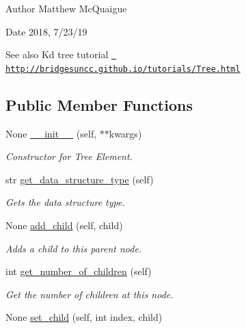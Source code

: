 \begin{DoxyAuthor}{Author}
Matthew Mc\+Quaigue
\end{DoxyAuthor}
\begin{DoxyDate}{Date}
2018, 7/23/19 
\end{DoxyDate}
\begin{DoxySeeAlso}{See also}
Kd tree tutorial \href{http://bridgesuncc.github.io/tutorials/Tree.html}{\texttt{ http\+://bridgesuncc.\+github.\+io/tutorials/\+Tree.\+html}} 
\end{DoxySeeAlso}
\subsection*{Public Member Functions}
\begin{DoxyCompactItemize}
\item 
None \mbox{\hyperlink{classbridges_1_1tree__element_1_1_tree_element_aec95cc1608f0c741ddd7e7a63174f3b7}{\+\_\+\+\_\+init\+\_\+\+\_\+}} (self, $\ast$$\ast$kwargs)
\begin{DoxyCompactList}\small\item\em Constructor for Tree Element. \end{DoxyCompactList}\item 
str \mbox{\hyperlink{classbridges_1_1tree__element_1_1_tree_element_a54a14bd74fe1f86dd73f90c57f88c10b}{get\+\_\+data\+\_\+structure\+\_\+type}} (self)
\begin{DoxyCompactList}\small\item\em Gets the data structure type. \end{DoxyCompactList}\item 
None \mbox{\hyperlink{classbridges_1_1tree__element_1_1_tree_element_a8a1b615249525c12bcdc6bbcb8e7ec09}{add\+\_\+child}} (self, child)
\begin{DoxyCompactList}\small\item\em Adds a child to this parent node. \end{DoxyCompactList}\item 
int \mbox{\hyperlink{classbridges_1_1tree__element_1_1_tree_element_a52b2386b667b8c6befb85f956d36321a}{get\+\_\+number\+\_\+of\+\_\+children}} (self)
\begin{DoxyCompactList}\small\item\em Get the number of children at this node. \end{DoxyCompactList}\item 
None \mbox{\hyperlink{classbridges_1_1tree__element_1_1_tree_element_abf4bdabe99cdd3f96db41f36d87cc25e}{set\+\_\+child}} (self, int index, child)
$$
\end{DoxyCompactItemize}
